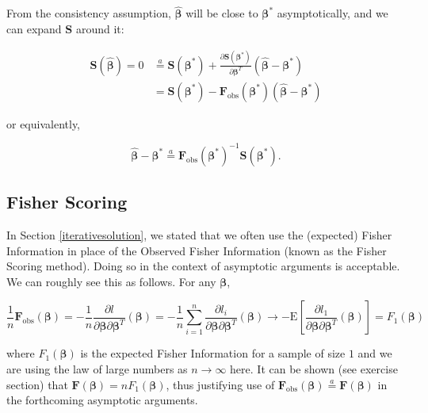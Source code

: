 \documentclass[
  12pt,
]{book}
\begin{document}
From the consistency assumption, \(\hat{\boldsymbol{\beta}}\) will be close to \(\boldsymbol{\beta}^*\) asymptotically, and we can expand \(\boldsymbol{S}\) around it:

\begin{align}
  \boldsymbol{S}(\hat{\boldsymbol{\beta}}) = 0
  & \stackrel{a}{=} \boldsymbol{S}(\boldsymbol{\beta}^*) +
    \frac{\partial \boldsymbol{S}(\boldsymbol{\beta}^*)}{\partial \boldsymbol{\beta}^{T}}(\hat{\boldsymbol{\beta}}- \boldsymbol{\beta}^*) \\
  & = \boldsymbol{S}(\boldsymbol{\beta}^*)
      -\boldsymbol{F}_{\text{obs}}(\boldsymbol{\beta}^*) (\hat{\boldsymbol{\beta}}- \boldsymbol{\beta}^*)
\end{align}

or equivalently,

\begin{equation}
  \hat{\boldsymbol{\beta}}- \boldsymbol{\beta}^*
  \stackrel{a}{=} \boldsymbol{F}_{\text{obs}}(\boldsymbol{\beta}^*)^{-1} \boldsymbol{S}(\boldsymbol{\beta}^*).
  \label{eq:expandS}
\end{equation}

\subsection{Fisher Scoring}\label{fisher-scoring}

In Section \ref{iterativesolution}, we stated that we often use the (expected) Fisher Information in place of the Observed Fisher Information (known as the Fisher Scoring method). Doing so in the context of asymptotic arguments is acceptable. We can roughly see this as follows. For any \(\boldsymbol{\beta}\),

\begin{equation}
  \frac{1}{n}\boldsymbol{F}_{\text{obs}}(\boldsymbol{\beta})
  = - \frac{1}{n} \frac{\partial l}{\partial \boldsymbol{\beta} \partial \boldsymbol{\beta}^T} (\boldsymbol{\beta}) 
  = - \frac{1}{n} \sum_{i=1}^n \frac{\partial l_i}{\partial \boldsymbol{\beta} \partial \boldsymbol{\beta}^T} (\boldsymbol{\beta})
  \rightarrow - \mathrm{E} \left[\frac{\partial l_1}{\partial \boldsymbol{\beta} \partial \boldsymbol{\beta}^T} (\boldsymbol{\beta}) \right]
  = F_1(\boldsymbol{\beta})
\end{equation}

where \(F_1(\boldsymbol{\beta})\) is the expected Fisher Information for a sample of size \(1\) and we are using the law of large numbers as \(n \rightarrow \infty\) here.
It can be shown (see exercise section) that \(\boldsymbol{F}(\boldsymbol{\beta}) = nF_1(\boldsymbol{\beta})\), thus justifying use of \(\boldsymbol{F}_{\text{obs}}(\boldsymbol{\beta}) \stackrel{a}{=} \boldsymbol{F}(\boldsymbol{\beta})\) in the forthcoming asymptotic arguments.
\end{document}
